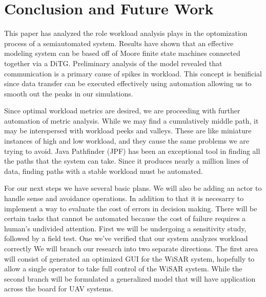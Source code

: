 \section{Conclusion and Future Work}
This paper has analyzed the role workload analysis plays in the optomization process of a semiautomated system. Results have shown that an effective modeling system can be based off of Moore finite state machines connected together via a DiTG. Preliminary analysis of the model revealed that communication is a primary cause of spikes in workload. This concept is benificial since data transfer can be executed effectively using automation allowing us to smooth out the peaks in our simulations.

Since optimal workload metrics are desired, we are proceeding with further
automation of metric analysis. While we may find a cumulatively middle path, it may be interspersed with workload peeks and valleys. These are like miniature instances of high and low workload, and they cause the same problems we are trying to avoid. Java Pathfinder (JPF) has been an exceptional tool in finding all the paths that the system can take. Since it produces nearly a million lines of data, finding paths with a stable workload must be automated.

For our next steps we have several basic plans. We will also be adding an actor to handle sense and avoidance operations. In addition to that it is necesarry to implement a way to evaluate the cost of errors in decision making. There will be certain tasks that cannot be automated because the cost of failure requires a human's undivided attention. First we will be undergoing a sensitivity study, followed by a field test. One we've verified that our system analyzes workload correctly We will branch our research into two separate directions. The first area will consist of generated an optimized GUI for the WiSAR system, hopefully to allow a single operator to take full control of the WiSAR system. While the second branch will be formulated a generalized model that will have application across the board for UAV systems.
